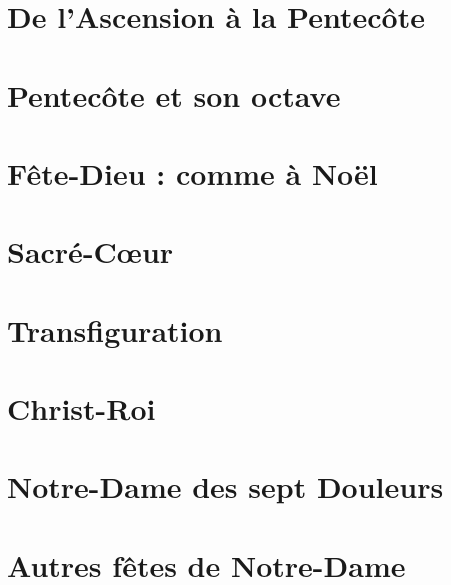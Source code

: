 \documentclass[%
a5paper%
,10pt%
,DIV=11%
,titlepage=on%
,headings=optiontoheadandtoc%
,headings=small%
,parskip=false%
]{scrbook}
\begin{document}

\vfill\filbreak
\section{De l'Ascension à la Pentecôte}\paginarectavacua
\vfill


\vfill\filbreak
\section{Pentecôte et son octave}\paginarectavacua
\vfill


\vfill\filbreak
\section*{Fête-Dieu : comme à Noël}\paginarectavacua
\vfill

\section{Sacré-Cœur}\paginarectavacua
\vfill


\vfill\filbreak
\section{Transfiguration}\paginarectavacua
\vfill


\vfill\filbreak
\section{Christ-Roi}\paginarectavacua
\vfill


\vfill\filbreak
\section{Notre-Dame des sept Douleurs}\paginarectavacua
\vfill


\vfill\filbreak
\section[Fêtes de la sainte Vierge]{Autres fêtes de Notre-Dame}\paginarectavacua
\vfill
\end{document}
